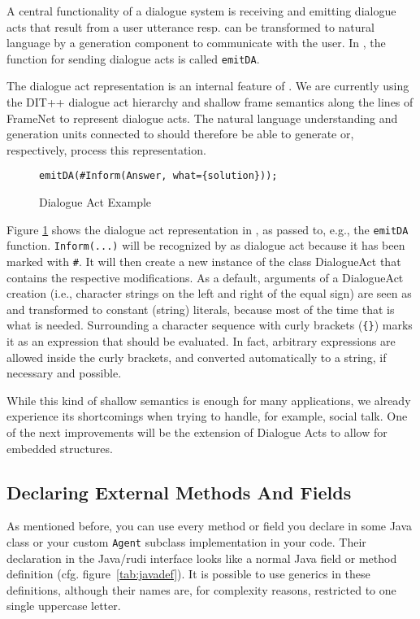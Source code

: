 A central functionality of a dialogue system is receiving and emitting dialogue
acts that result from a user utterance resp. can be transformed to natural
language by a generation component to communicate with the user. In \vonda,
the function for sending dialogue acts is called \texttt{emitDA}.

The dialogue act representation is an internal feature of \vonda. We are
currently using the DIT++ dialogue act hierarchy \citep{bunt2012iso} and
shallow frame semantics along the lines of FrameNet
\citep{ruppenhofer2016framenet} to represent dialogue acts. The natural
language understanding and generation units connected to \vonda should
therefore be able to generate or, respectively, process this representation.

\begin{figure}[htb]
  \centering\small\texttt{emitDA(\#Inform(Answer, what=\{solution\}));}
  \vspace*{-1ex}\caption{\label{fig:DA}Dialogue Act Example}
\end{figure}

Figure \ref{fig:DA} shows the dialogue act representation in \vonda, as passed
to, e.g., the \texttt{emitDA} function. \texttt{Inform}\verb|(...)| will be
recognized by \vonda as dialogue act because it has been marked with
\verb|#|. It will then create a new instance of the class DialogueAct that
contains the respective modifications. As a default, arguments of a DialogueAct
creation (i.e., character strings on the left and right of the equal sign) are
seen as and transformed to constant (string) literals, because most of the time
that is what is needed.  Surrounding a character sequence with curly brackets
(\texttt{\{\}}) marks it as an expression that should be evaluated. In fact,
arbitrary expressions are allowed inside the curly brackets, and converted
automatically to a string, if necessary and possible.

While this kind of shallow semantics is enough for many applications, we
already experience its shortcomings when trying to handle, for example, social
talk. One of the next improvements will be the extension of Dialogue Acts to
allow for embedded structures.


\subsection{Declaring External Methods And Fields}
\label{sec:javatypes}

As mentioned before, you can use every method or field you declare in
some Java class or your custom \texttt{Agent} subclass implementation
in your \vonda code. Their declaration in the Java/rudi interface
looks like a normal Java field or method definition
(cfg. figure~\ref{tab:javadef}). It is possible to use generics in
these definitions, although their names are, for complexity reasons,
restricted to one single uppercase letter.

